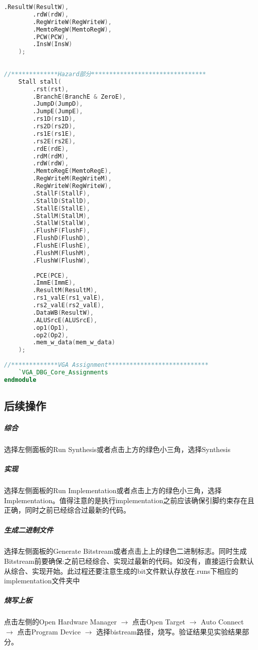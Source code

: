 \begin{lstlisting}[language = {verilog}]
        .ResultW(ResultW),
        .rdW(rdW),
        .RegWriteW(RegWriteW),
        .MemtoRegW(MemtoRegW),
        .PCW(PCW),
        .InsW(InsW)
    );
    
    
//*************Hazard部分********************************
    Stall stall(
        .rst(rst),
        .BranchE(BranchE & ZeroE),
        .JumpD(JumpD),
        .JumpE(JumpE),
        .rs1D(rs1D),
        .rs2D(rs2D),
        .rs1E(rs1E),
        .rs2E(rs2E),
        .rdE(rdE),
        .rdM(rdM),
        .rdW(rdW),
        .MemtoRegE(MemtoRegE),
        .RegWriteM(RegWriteM),
        .RegWriteW(RegWriteW),
        .StallF(StallF),
        .StallD(StallD),
        .StallE(StallE),
        .StallM(StallM),
        .StallW(StallW),
        .FlushF(FlushF),
        .FlushD(FlushD),
        .FlushE(FlushE),
        .FlushM(FlushM),
        .FlushW(FlushW),
        
        .PCE(PCE),
        .ImmE(ImmE),
        .ResultM(ResultM),
        .rs1_valE(rs1_valE),
        .rs2_valE(rs2_valE),
        .DataWB(ResultW),
        .ALUSrcE(ALUSrcE),
        .op1(Op1),
        .op2(Op2),
        .mem_w_data(mem_w_data)
    );
    
//*************VGA Assignment****************************
    `VGA_DBG_Core_Assignments
endmodule
\end{lstlisting}

\subsection{后续操作}
\subparagraph{综合} 选择左侧面板的Run Synthesis或者点击上方的绿色小三角，选择Synthesis
\subparagraph{实现} 选择左侧面板的Run Implementation或者点击上方的绿色小三角，选择Implementation。值得注意的是执行implementation之前应该确保引脚约束存在且正确，同时之前已经综合过最新的代码。
\subparagraph{生成二进制文件} 选择左侧面板的Generate Bitstream或者点击上上的绿色二进制标志。同时生成Bitstream前要确保:之前已经综合、实现过最新的代码。如没有，直接运行会默认从综合、实现开始。此过程还要注意生成的bit文件默认存放在.runs下相应的implementation文件夹中
\subparagraph{烧写上板} 点击左侧的Open Hardware Manager $\rightarrow$ 点击Open Target $\rightarrow$ Auto Connect $\rightarrow$ 点击Program Device $\rightarrow$ 选择bistream路径，烧写。验证结果见实验结果部分。
